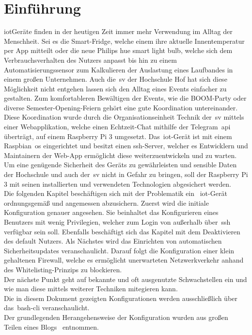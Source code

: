 
\section{Einführung}\label{sec:einfuhrung}
\gls{iot}Geräte finden in der heutigen Zeit immer mehr Verwendung im Alltag der Menschheit.
Sei es die Smart-Fridge, welche einem ihre aktuelle Innentemperatur per App mitteilt oder die neue Philips hue smart light bulb,
welche sich dem Verbrauchsverhalten des Nutzers anpasst bis hin zu einem Automatisierungssensor zum Kalkulieren der Auslastung eines Laufbandes in einem großen Unternehmen.
Auch die~\gls{sv} der Hochschule Hof hat sich diese Möglichkeit nicht entgehen lassen sich den Alltag eines Events einfacher zu gestalten.
Zum komfortableren Bewältigen der Events, wie die BOOM-Party oder diverse Semester-Opening-Feiern gehört eine gute Koordination untereinander.
Diese Koordination wurde durch die Organisationseinheit Technik der~\gls{sv} mittels einer Webapplikation, welche einen Echtzeit-Chat mithilfe der Telegram~\gls{api} überträgt, auf einem Raspberry Pi 3 umgesetzt.
Das~\gls{iot}-Gerät ist mit einem Raspbian~\gls{os} eingerichtet und besitzt einen \gls{ssh}-Server, welcher es Entwicklern und Maintainern der Web-App ermöglicht diese weiterzuentwickeln und zu warten.
Um eine genügende Sicherheit des Geräts zu gewährleisten und sensible Daten der Hochschule und auch der~\gls{sv} nicht in Gefahr zu bringen, soll der Raspberry Pi 3 mit seinen installierten und verwendeten Technologien
abgesichert werden.\\
\blankline
Die folgenden Kapitel beschäftigen sich mit der Problematik ein ~\gls{iot}-Gerät ordnungsgemäß und angemessen abzusichern.
Zuerst wird die initiale Konfiguration genauer angesehen.
Sie beinhaltet das Konfigurieren eines Benutzers mit wenig Privilegien, welcher zum Login von außerhalb über~\gls{ssh} verfügbar sein soll.
Ebenfalls beschäftigt sich das Kapitel mit dem Deaktivieren des default Nutzers.
Als Nächstes wird das Einrichten von automatischen Sicherheitsupdates veranschaulicht.
Darauf folgt die Konfiguration einer klein gehaltenen Firewall, welche es ermöglicht unerwarteten Netzwerkverkehr anhand des Whitelisting-Prinzips zu blockieren.\\
Der nächste Punkt geht auf bekannte und oft ausgenutzte Schwachstellen ein und wie man diese mittels weiterer Techniken mitegieren kann. \\
Die in diesem Dokument gezeigten Konfigurationen werden ausschließlich über das~\gls{bash}-\gls{cli} veranschaulicht. \\
\linebreak
Der grundlegenden Herangehensweise der Konfiguration wurden aus großen Teilen eines Blogs~\cite{rasp-hardening} entnommen.
